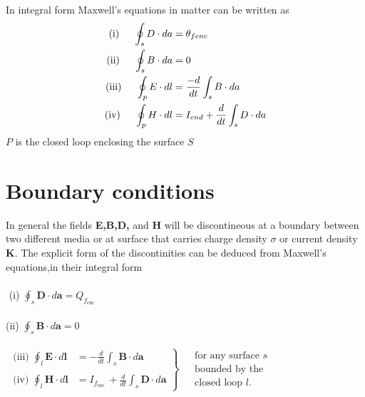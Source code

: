 In integral form Maxwell's equations in matter can be written as\\
\begin{align*}
\text{(i)}\hspace{0.5cm}\oint_{s}D\cdot da&=\theta_{fenc}\\
\text{(ii)}\hspace{0.5cm}\oint_{s}B\cdot da&=0\\
\text{(iii)}\hspace{0.5cm}\oint_{p}E\cdot dl&=\frac{-d}{dt}\int_{s} B\cdot da\\
\text{(iv)}\hspace{0.5cm}\oint_{p}H\cdot dl&=I_{end}+\frac{d}{dt}\int_{s} D\cdot da\\
\end{align*}
$P$ is the closed loop enclosing the surface $S$
\section{Boundary conditions}
In general the fields \textbf{E,B,D,} and \textbf{H} will be discontineous at a boundary between two different media or at surface that carries charge density $\sigma$ or current density \textbf{K}. The explicit form of the discontinities can be deduced from Maxwell's equations,in their integral form\\\\
$\left. \right. $\hspace{0.28cm} (i) $\oint_s \mathbf{D} \cdot d \mathbf{a}=Q_{f_{\mathrm{enc}}}$\\\\
$\left. \right. $\hspace{0.3cm}(ii) $\oint_s \mathbf{B} \cdot d \mathbf{a}=0$\\\\
$\left.\begin{array}{ll}\text { (iii) } \oint_l \mathbf{E} \cdot d \mathbf{l} & =-\frac{d}{d t} \int_s \mathbf{B} \cdot d \mathbf{a} \\ \\
\text { (iv) } \oint_l \mathbf{H} \cdot d \mathbf{l} & =I_{f_{\text {enc }}}+\frac{d}{d t} \int_s \mathbf{D} \cdot d \mathbf{a}\end{array}\right\} \begin{aligned}&\text { for any surface } s \\&\text { bounded by the } \\&\text { closed loop } l .\end{aligned}$\\\\
